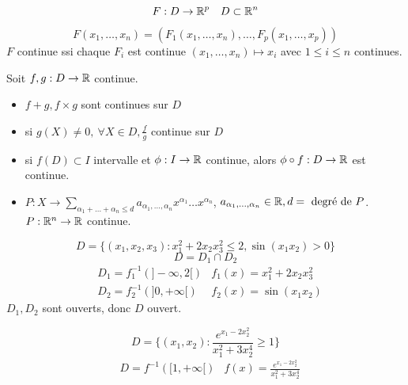 \[
F:D \to \mathbb{R}^p \quad D \subset \mathbb{R}^n
\] 

\[
F(x_1, \ldots, x_n) = (F_1(x_1, \ldots, x_n), \ldots, F_p(x_1, \ldots, x_p))
\] 
$F$ continue ssi chaque  $F_i$ est continue  $(x_1, \ldots, x_n) \mapsto x_i$ avec $1 \le i \le n$ continues.

\begin{prop}
   Soit $f, g: D \to \mathbb{R}$ continue. 
   \begin{itemize}
       \item $f + g, f \times g$ sont continues sur $D$
       \item si  $g(X) \neq 0, \: \forall X \in D, \frac{f}{g}$ continue sur $D$
       \item si  $f(D) \subset I$ intervalle et $\phi: I \to \mathbb{R}$ continue, alors $\phi \circ f: D \to \mathbb{R}$ est continue.
       \item $P: X \to \sum_{\alpha_1 + \ldots + \alpha_n \le d}^{} a_{\alpha_1, \ldots, \alpha_n}x^{\alpha_1} \ldots x^{\alpha_n}$, $a_{\alpha_1, \ldots, \alpha_n} \in \mathbb{R}, d = \text{ degré de } P$. $P: \mathbb{R}^n \to \mathbb{R}$ continue.
   \end{itemize}
\end{prop}
\begin{eg}
   \[
       D = \{(x_1, x_2, x_3): x_1^2 + 2x_2x_3^2 \le 2, \sin(x_1x_2) > 0\}
   \]  
   \[
   D = D_1 \cap D_2
   \] 
   \begin{align*}
       &D_1 = f_1^{-1}(]-\infty, 2[) &f_1(x) = x_1^2 + 2x_2x_3^2\\
       &D_2 = f_2^{-1}(]0, +\infty[) &f_2(x) = \sin(x_1x_2)
   \end{align*}
   $D_1, D_2$ sont ouverts, donc $D$ ouvert.
\end{eg}
\begin{eg}
   \[
       D = \{(x_1, x_2): \frac{e^{x_1 - 2x_2^2}}{x_1^2 + 3x_2^4} \ge 1 \}
   \]  
   \begin{align*}
       &D = f^{-1}([1, +\infty[) &f(x) = \frac{e^{x_1 - 2x_2^2}}{x_1^2 + 3x_2^4}
   \end{align*}
\end{eg}

